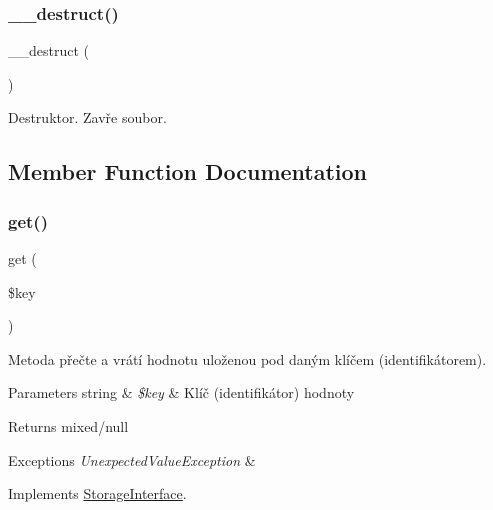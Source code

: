 \subsubsection{\texorpdfstring{\+\_\+\+\_\+destruct()}{\_\_destruct()}}
{\footnotesize\ttfamily \+\_\+\+\_\+destruct (\begin{DoxyParamCaption}{ }\end{DoxyParamCaption})}

Destruktor. Zavře soubor. 

\subsection{Member Function Documentation}
\mbox{\label{class_pes_1_1_storage_1_1_array_file_a24a9bf83a1002d46ece83a93d14bd921}} 
\subsubsection{\texorpdfstring{get()}{get()}}
{\footnotesize\ttfamily get (\begin{DoxyParamCaption}\item[{}]{\$key }\end{DoxyParamCaption})}

Metoda přečte a vrátí hodnotu uloženou pod daným klíčem (identifikátorem). 
\begin{DoxyParams}[1]{Parameters}
string & {\em \$key} & Klíč (identifikátor) hodnoty \\
\hline
\end{DoxyParams}
\begin{DoxyReturn}{Returns}
mixed/null 
\end{DoxyReturn}

\begin{DoxyExceptions}{Exceptions}
{\em Unexpected\+Value\+Exception} & \\
\hline
\end{DoxyExceptions}


Implements \mbox{\hyperlink{interface_pes_1_1_storage_1_1_storage_interface}{Storage\+Interface}}.

\mbox{\label{class_pes_1_1_storage_1_1_array_file_a08fb2636fbdda74d4a1f1c65a47d05eb}} 
